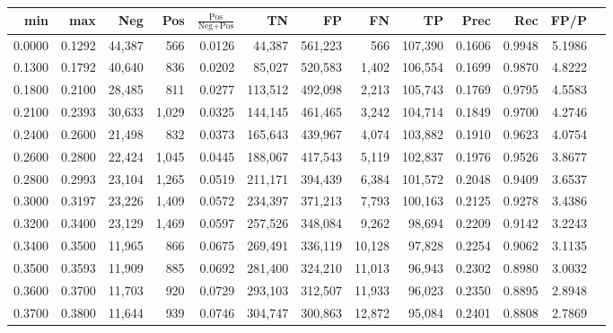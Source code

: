 \begin{tabular}{rrrrrrrrrrrrr}
\toprule
   min &    max &    Neg &   Pos & $\frac{\text{Pos}}{\text{Neg}+\text{Pos}}$ &      TN &      FP &      FN &      TP &   Prec &    Rec &   FP/P \\
\midrule
0.0000 & 0.1292 & 44,387 &   566 &                                     0.0126 &  44,387 & 561,223 &     566 & 107,390 & 0.1606 & 0.9948 & 5.1986 \\
0.1300 & 0.1792 & 40,640 &   836 &                                     0.0202 &  85,027 & 520,583 &   1,402 & 106,554 & 0.1699 & 0.9870 & 4.8222 \\
0.1800 & 0.2100 & 28,485 &   811 &                                     0.0277 & 113,512 & 492,098 &   2,213 & 105,743 & 0.1769 & 0.9795 & 4.5583 \\
0.2100 & 0.2393 & 30,633 & 1,029 &                                     0.0325 & 144,145 & 461,465 &   3,242 & 104,714 & 0.1849 & 0.9700 & 4.2746 \\
0.2400 & 0.2600 & 21,498 &   832 &                                     0.0373 & 165,643 & 439,967 &   4,074 & 103,882 & 0.1910 & 0.9623 & 4.0754 \\
0.2600 & 0.2800 & 22,424 & 1,045 &                                     0.0445 & 188,067 & 417,543 &   5,119 & 102,837 & 0.1976 & 0.9526 & 3.8677 \\
0.2800 & 0.2993 & 23,104 & 1,265 &                                     0.0519 & 211,171 & 394,439 &   6,384 & 101,572 & 0.2048 & 0.9409 & 3.6537 \\
0.3000 & 0.3197 & 23,226 & 1,409 &                                     0.0572 & 234,397 & 371,213 &   7,793 & 100,163 & 0.2125 & 0.9278 & 3.4386 \\
0.3200 & 0.3400 & 23,129 & 1,469 &                                     0.0597 & 257,526 & 348,084 &   9,262 &  98,694 & 0.2209 & 0.9142 & 3.2243 \\
0.3400 & 0.3500 & 11,965 &   866 &                                     0.0675 & 269,491 & 336,119 &  10,128 &  97,828 & 0.2254 & 0.9062 & 3.1135 \\
0.3500 & 0.3593 & 11,909 &   885 &                                     0.0692 & 281,400 & 324,210 &  11,013 &  96,943 & 0.2302 & 0.8980 & 3.0032 \\
0.3600 & 0.3700 & 11,703 &   920 &                                     0.0729 & 293,103 & 312,507 &  11,933 &  96,023 & 0.2350 & 0.8895 & 2.8948 \\
0.3700 & 0.3800 & 11,644 &   939 &                                     0.0746 & 304,747 & 300,863 &  12,872 &  95,084 & 0.2401 & 0.8808 & 2.7869 \\

\end{tabular}

